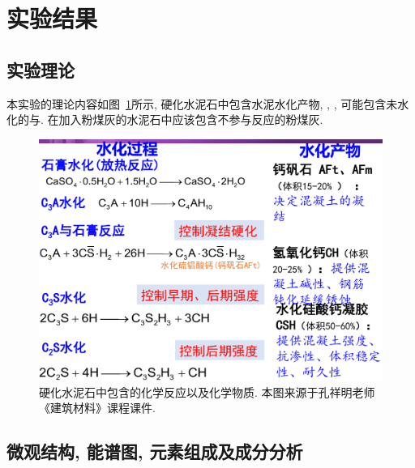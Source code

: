 
\section{实验结果}

\subsection{实验理论}
本实验的理论内容如图~\ref{fig:mechanism}所示, 硬化水泥石中包含水泥水化产物, , , 可能包含未水化的与. 在加入粉煤灰的水泥石中应该包含不参与反应的粉煤灰. 

\begin{figure}[!t]
  \centering
  \includegraphics[width = 0.6\linewidth]{figures/exp3/mechanism.png}
  \caption{硬化水泥石中包含的化学反应以及化学物质. 本图来源于孔祥明老师《建筑材料》课程课件. }
  \label{fig:mechanism}
\end{figure}

\subsection{微观结构, 能谱图, 元素组成及成分分析}

